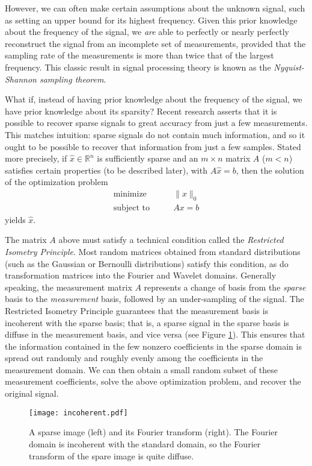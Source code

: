 However, we can often make certain assumptions about the unknown signal, such as setting an upper bound for
its highest frequency. Given this prior knowledge about the frequency of the signal, we \emph{are} able to 
perfectly or nearly perfectly reconstruct the signal from an incomplete set of measurements, provided that
the sampling rate of the measurements is more than twice that of the largest frequency. This classic result
in signal processing theory is known as the \emph{Nyquist-Shannon sampling theorem}.

What if, instead of having prior knowledge about the frequency of the signal, we have prior knowledge about
its sparsity? Recent research asserts that it is possible to recover sparse signals to great accuracy from just 
a few measurements. This matches intuition: sparse signals do not contain much information, and so it ought to
be possible to recover that information from just a few samples. Stated more precisely, if $\hat{x} \in \mathbb{R}^n$ 
is sufficiently sparse and an $m \times n$ matrix $A$ ($m < n$) satisfies certain properties (to be described later),
with $A\hat{x} = b$, then the solution of the optimization problem
\begin{align*}
\text{minimize}\qquad &\|x\|_0\\
\text{subject to}\qquad &Ax = b
\end{align*}
yields $\hat{x}$. 

The matrix $A$ above must satisfy a technical condition called the \emph{Restricted Isometry Principle}. Most
random matrices obtained from standard distributions (such as the Gaussian or Bernoulli distributions) satisfy this
condition, as do transformation matrices into the Fourier and Wavelet domains. Generally speaking,
the measurement matrix $A$ represents a change of basis from the \emph{sparse} basis to the \emph{measurement} basis, 
followed by an under-sampling of the signal. The Restricted Isometry Principle guarantees that the measurement
basis is incoherent with the sparse basis; that is, a sparse signal in the sparse basis is diffuse in the measurement
basis, and vice versa (see Figure \ref{fig:incoherent}). This ensures that the information contained in the few nonzero
coefficients in the sparse
domain is spread out randomly and roughly evenly among the coefficients in the measurement domain. 
We can then obtain a small random subset of these measurement coefficients, solve the above optimization problem,
and recover the original signal. 

\begin{figure}
\centering
\texttt{[image: incoherent.pdf]}
\caption{A sparse image (left) and its Fourier transform (right). The Fourier domain is incoherent with the 
standard domain, so the Fourier transform of the spare image is quite diffuse.}
\label{fig:incoherent}
\end{figure}

